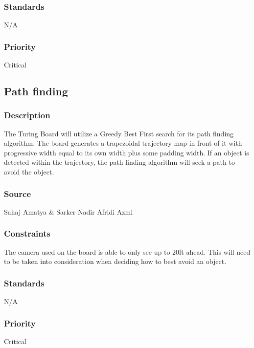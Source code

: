 \subsubsection{Standards}
N/A
\subsubsection{Priority}
Critical

\subsection{Path finding}
\subsubsection{Description}
The Turing Board will utilize a Greedy Best First search for its path finding algorithm. The board generates a trapezoidal trajectory map in front of it with progressive width equal to its own width plus some padding width. If an object is detected within the trajectory, the path finding algorithm will seek a path to avoid the object.
\subsubsection{Source}
Sahaj Amatya \& Sarker Nadir Afridi Azmi
\subsubsection{Constraints}
The camera used on the board is able to only see up to 20ft ahead. This will need to be taken into consideration when deciding how to best avoid an object.
\subsubsection{Standards}
N/A
\subsubsection{Priority}
Critical
